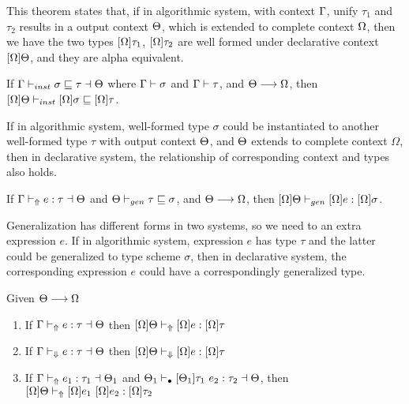 This theorem states that, if in algorithmic system, with context $\Gamma$, unify $\tau_1$ and $\tau_2$ results in a output context $\Theta$, which is extended to complete context $\Omega$, then we have the two types $[\Omega]\tau_1$, $[\Omega]\tau_2$ are well formed under declarative context $[\Omega]\Theta$, and they are alpha equivalent.

\begin{theorem}

If $\Gamma {} \vdash_{inst} \sigma \sqsubseteq \tau \dashv \Theta$ where $\Gamma {} \vdash \sigma$ and $\Gamma {} \vdash \tau$,
and $\Theta \longrightarrow \Omega$,
then $[\Omega]\Theta \vdash_{inst} [\Omega]\sigma \sqsubseteq [\Omega]\tau$.
\end{theorem}

If in algorithmic system, well-formed type $\sigma$ could be instantiated to another well-formed type $\tau$ with output context $\Theta$, and $\Theta$ extends to complete context $\Omega$, then in declarative system, the relationship of corresponding context and types also holds.

\begin{theorem}

If $\Gamma {} \vdash_\Uparrow e:\tau \dashv \Theta $ and $\Theta \vdash_{gen} \tau \sqsubseteq \sigma$,
and $\Theta \longrightarrow \Omega$,
then $[\Omega]\Theta \vdash_{gen} [\Omega]e:[\Omega]\sigma$.
\end{theorem}

Generalization has different forms in two systems, so we need to an extra expression $e$. If in algorithmic system, expression $e$ has type $\tau$ and the latter could be generalized to type scheme $\sigma$, then in declarative system, the corresponding expression $e$ could have a correspondingly generalized type.

\begin{theorem}

Given $\Theta \longrightarrow \Omega$
\begin{enumerate}
   \item If $\Gamma {} \vdash_\Uparrow e: \tau \dashv \Theta$ then $[\Omega]\Theta \vdash_\Uparrow [\Omega]e: [\Omega]\tau$
   \item If $\Gamma {} \vdash_\Downarrow e: \tau \dashv \Theta$ then $[\Omega]\Theta \vdash_\Downarrow [\Omega]e: [\Omega]\tau$
   \item If $\Gamma {} \vdash_\Uparrow e_1:\tau_1 \dashv \Theta_1$ and $\Theta_1 \vdash_\bullet [\Theta_1]\tau_1 ~ e_2 : \tau_2 \dashv \Theta$,
       then $[\Omega]\Theta \vdash_\Uparrow [\Omega]e_1 ~ [\Omega]e_2 : [\Omega]\tau_2$
\end{enumerate}
\end{theorem}

